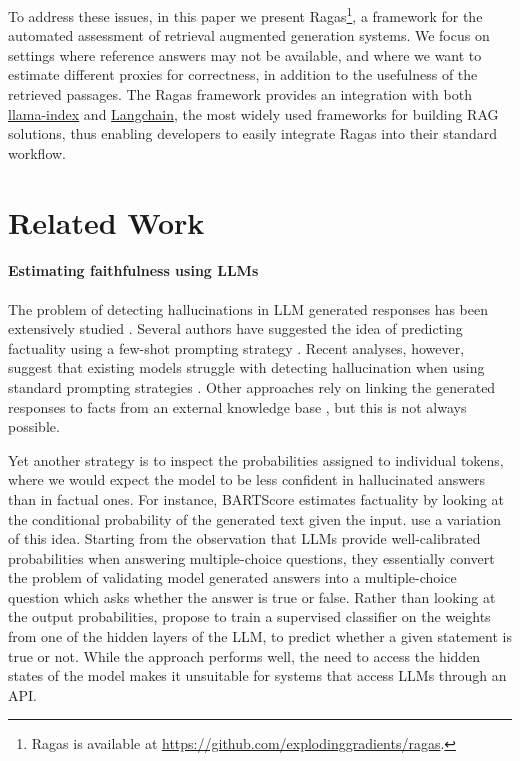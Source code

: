 \documentclass[11pt]{article}
\begin{document}
To address these issues, in this paper we present Ragas\footnote{Ragas is available at \url{https://github.com/explodinggradients/ragas}.}, a framework for the automated assessment of retrieval augmented generation systems. We focus on settings where reference answers may not be available, and where we want to estimate different proxies for correctness, in addition to the usefulness of the retrieved passages. The Ragas framework provides an integration with both \href{https://github.com/jerryjliu/llama_index}{llama-index} and \href{https://github.com/langchain-ai/langchain}{Langchain}, the most widely used frameworks for building RAG solutions, thus enabling developers to easily integrate Ragas into their standard workflow.


\section{Related Work}

\paragraph{Estimating faithfulness using LLMs}
The problem of detecting hallucinations in LLM generated responses has been extensively studied \cite{ji2023survey}. Several authors have suggested the idea of predicting factuality using a few-shot prompting strategy \cite{DBLP:journals/corr/abs-2304-03728}. Recent analyses, however, suggest that existing models struggle with detecting hallucination when using standard prompting strategies \cite{DBLP:journals/corr/abs-2305-11747,DBLP:journals/corr/abs-2304-13734}. Other approaches rely on linking the generated responses to facts from an external knowledge base \cite{DBLP:journals/corr/abs-2305-14251}, but this is not always possible.

Yet another strategy is to inspect the probabilities assigned to individual tokens, where we would expect the model to be less confident in hallucinated answers than in factual ones. For instance, BARTScore \cite{DBLP:conf/nips/YuanNL21} estimates factuality by looking at the conditional probability of the generated text given the input. \citet{DBLP:journals/corr/abs-2207-05221} use a variation of this idea. Starting from the observation that LLMs provide well-calibrated probabilities when answering multiple-choice questions, they essentially convert the problem of validating model generated answers into a multiple-choice question which asks whether the answer is true or false. Rather than looking at the output probabilities, \citet{DBLP:journals/corr/abs-2304-13734} propose to train a supervised classifier on the weights from one of the hidden layers of the LLM, to predict whether a given statement is true or not. While the approach performs well, the need to access the hidden states of the model makes it unsuitable for systems that access LLMs through an API.
\end{document}
